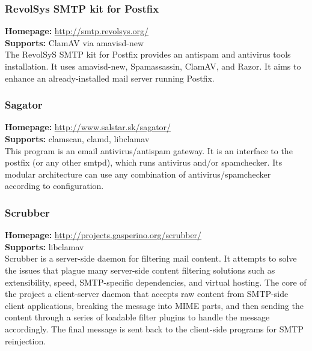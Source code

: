 \documentclass[a4paper,titlepage,12pt]{article}
\begin{document}
    \subsubsection{RevolSys SMTP kit for Postfix}
    \textbf{Homepage:} \url{http://smtp.revolsys.org/}\\
    \textbf{Supports:} ClamAV via amavisd-new\\[4pt]
    The RevolSyS SMTP kit for Postfix provides an antispam and antivirus
    tools installation. It uses amavisd-new, Spamassassin, ClamAV, and Razor.
    It aims to enhance an already-installed mail server running Postfix.

    \subsubsection{Sagator}
    \textbf{Homepage:} \url{http://www.salstar.sk/sagator/}\\
    \textbf{Supports:} clamscan, clamd, libclamav\\[4pt]
    This program is an email antivirus/antispam gateway. It is an interface
    to the postfix (or any other smtpd), which runs antivirus
    and/or spamchecker. Its modular architecture can use any
    combination of antivirus/spamchecker according to configuration.

    \subsubsection{Scrubber}
    \textbf{Homepage:} \url{http://projects.gasperino.org/scrubber/}\\
    \textbf{Supports:} libclamav\\[4pt]
    Scrubber is a server-side daemon for filtering mail content. It attempts
    to solve the issues that plague many server-side content filtering
    solutions such as extensibility, speed, SMTP-specific dependencies, and
    virtual hosting. The core of the project a client-server daemon that
    accepts raw content from SMTP-side client applications, breaking the
    message into MIME parts, and then sending the content through a series of
    loadable filter plugins to handle the message accordingly. The final
    message is sent back to the client-side programs for SMTP reinjection.
\end{document}
